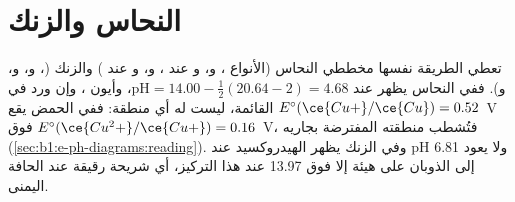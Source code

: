 \section{النحاس والزنك}

تعطي الطريقة نفسها مخططي النحاس (الأنواع ، و،
و عند ، و، و عند ) والزنك (،
و، و، و). ففي النحاس يظهر 
عند $\mathrm{pH} = 14.00 - \frac12(20.64 - 2) = 4.68$، وأيون ، وإن ورد في القائمة، ليست له
أي منطقة: ففي الحمض يقع $E^\circ(\ce{Cu+}/\ce{Cu}) = 0.52$~V فوق
$E^\circ(\ce{Cu^2+}/\ce{Cu+}) = 0.16$~V، فتُشطب منطقته المفترضة
بجاريه (\cref{sec:b1:e-ph-diagrams:reading}).
وفي الزنك يظهر الهيدروكسيد عند pH 6.81 ولا يعود إلى الذوبان على هيئة
 إلا فوق 13.97 عند هذا التركيز، أي شريحة رقيقة عند
الحافة اليمنى.

